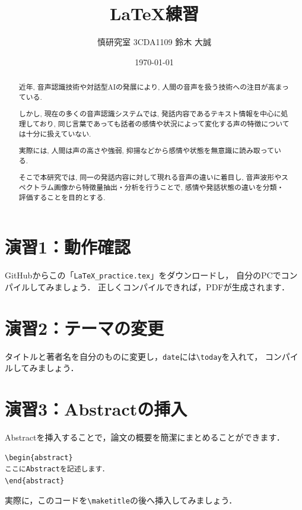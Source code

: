 \documentclass[a4paper,twocolumn]{jsarticle}
\title{%
LaTeX練習
}
\author{慎研究室 3CDA1109 鈴木 大誠}
\date{\today}
\begin{document}
\maketitle

\begin{abstract}
近年, 音声認識技術や対話型AIの発展により, 人間の音声を扱う技術への注目が高まっている.

しかし, 現在の多くの音声認識システムでは, 発話内容であるテキスト情報を中心に処理しており, 同じ言葉であっても話者の感情や状況によって変化する声の特徴については十分に扱えていない.

実際には, 人間は声の高さや強弱, 抑揚などから感情や状態を無意識に読み取っている.

そこで本研究では, 同一の発話内容に対して現れる音声の違いに着目し, 音声波形やスペクトラム画像から特徴量抽出・分析を行うことで, 感情や発話状態の違いを分類・評価することを目的とする.
\end{abstract}



\section*{演習1：動作確認}
GitHubからこの「\texttt{LaTeX\_practice.tex}」をダウンロードし，
自分のPCでコンパイルしてみましょう．
正しくコンパイルできれば，PDFが生成されます．

\section*{演習2：テーマの変更}
タイトルと著者名を自分のものに変更し，\texttt{date}には\verb|\today|を入れて，
コンパイルしてみましょう．

\section*{演習3：Abstractの挿入}
Abstractを挿入することで，論文の概要を簡潔にまとめることができます．

\begin{verbatim}
\begin{abstract}
ここにAbstractを記述します．
\end{abstract}
\end{verbatim}

実際に，このコードを\verb|\maketitle|の後へ挿入してみましょう．
\end{document}
